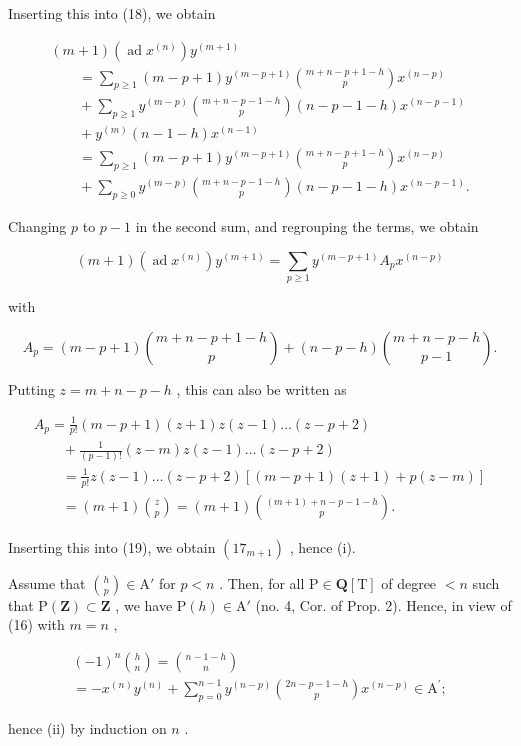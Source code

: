 Inserting this into (18), we obtain

\[
\begin{array}{l} (m + 1) (\operatorname{ad} x ^ {(n)}) y ^ {(m + 1)} \\ \qquad = \sum_ {p \geq 1} (m - p + 1) y ^ {(m - p + 1)} \binom {m + n - p + 1 - h} {p} x ^ {(n - p)} \\ \qquad + \sum_ {p \geq 1} y ^ {(m - p)} \binom {m + n - p - 1 - h} {p} (n - p - 1 - h) x ^ {(n - p - 1)} \\ \qquad + y ^ {(m)} (n - 1 - h) x ^ {(n - 1)} \\ \qquad = \sum_ {p \geq 1} (m - p + 1) y ^ {(m - p + 1)} \binom {m + n - p + 1 - h} {p} x ^ {(n - p)} \\ \qquad + \sum_ {p \geq 0} y ^ {(m - p)} \binom {m + n - p - 1 - h} {p} (n - p - 1 - h) x ^ {(n - p - 1)}. \end{array}
\]

Changing \(p\) to \(p - 1\) in the second sum, and regrouping the terms, we obtain

\[
(m + 1) (\operatorname{ad} x ^ {(n)}) y ^ {(m + 1)} = \sum_ {p \geq 1} y ^ {(m - p + 1)} A _ {p} x ^ {(n - p)}\tag{19}
\]

with

\[
A _ {p} = (m - p + 1) \binom{m + n - p + 1 - h}{p} + (n - p - h) \binom{m + n - p - h}{p - 1}.
\]

Putting \(z = m + n - p - h\) , this can also be written as

\[
\begin{array}{l} A _ {p} = \frac {1}{p !} (m - p + 1) (z + 1) z (z - 1) \dots (z - p + 2) \\ \qquad + \frac {1}{(p - 1) !} (z - m) z (z - 1) \dots (z - p + 2) \\ \qquad = \frac {1}{p !} z (z - 1) \dots (z - p + 2) [ (m - p + 1) (z + 1) + p (z - m) ] \\ \qquad = (m + 1) \binom {z} {p} = (m + 1) \binom {(m + 1) + n - p - 1 - h} {p}. \end{array}
\]

Inserting this into (19), we obtain \((17_{m + 1})\) , hence (i).

Assume that \(\binom{h}{p} \in \mathrm{A}'\) for \(p < n\) . Then, for all \(\mathrm{P} \in \mathbf{Q}[\mathrm{T}]\) of degree \(< n\) such that \(\mathrm{P}(\mathbf{Z}) \subset \mathbf{Z}\) , we have \(\mathrm{P}(h) \in \mathrm{A}'\) (no. 4, Cor. of Prop. 2). Hence, in view of (16) with \(m = n\) ,

\[
\begin{array}{c} (- 1) ^ {n} \binom{h}{n} = \binom{n - 1 - h}{n} \\ = - x ^ {(n)} y ^ {(n)} + \sum_ {p = 0} ^ {n - 1} y ^ {(n - p)} \binom{2 n - p - 1 - h}{p} x ^ {(n - p)} \in \mathrm{A} ^ {\prime}; \end{array}
\]

hence (ii) by induction on \(n\) .

